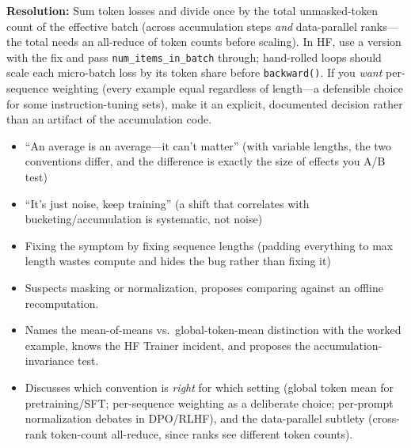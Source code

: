 \begin{interviewq}
\textbf{Resolution:} Sum token losses and divide once by the total unmasked-token count of the effective batch (across accumulation steps \textit{and} data-parallel ranks---the total needs an all-reduce of token counts before scaling). In HF, use a version with the fix and pass \texttt{num\_items\_in\_batch} through; hand-rolled loops should scale each micro-batch loss by its token share before \texttt{backward()}. If you \textit{want} per-sequence weighting (every example equal regardless of length---a defensible choice for some instruction-tuning sets), make it an explicit, documented decision rather than an artifact of the accumulation code.

\redflags
\begin{itemize}
    \item ``An average is an average---it can't matter'' (with variable lengths, the two conventions differ, and the difference is exactly the size of effects you A/B test)
    \item ``It's just noise, keep training'' (a shift that correlates with bucketing/accumulation is systematic, not noise)
    \item Fixing the symptom by fixing sequence lengths (padding everything to max length wastes compute and hides the bug rather than fixing it)
\end{itemize}


\goodgreat
\begin{itemize}
    \item {} Suspects masking or normalization, proposes comparing against an offline recomputation.
    \item {} Names the mean-of-means vs.\ global-token-mean distinction with the worked example, knows the HF Trainer incident, and proposes the accumulation-invariance test.
    \item {} Discusses which convention is \textit{right} for which setting (global token mean for pretraining/SFT; per-sequence weighting as a deliberate choice; per-prompt normalization debates in DPO/RLHF), and the data-parallel subtlety (cross-rank token-count all-reduce, since ranks see different token counts).
\end{itemize}

\end{interviewq}

